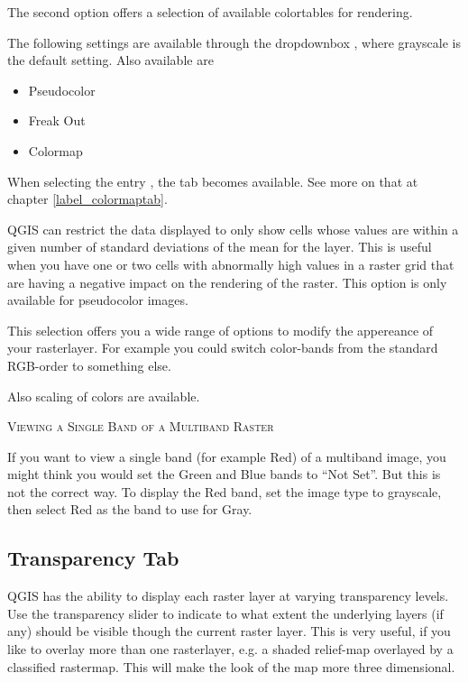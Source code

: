 The second option offers a selection of available colortables for rendering.

The following settings are available through the dropdownbox
, where grayscale is the default
setting.
Also available are
\begin{itemize}[label=--]
\item Pseudocolor
\item Freak Out
\item Colormap
\end{itemize}

When selecting the entry , the tab
 becomes available. See more on that at chapter
\ref{label_colormaptab}.

QGIS can restrict the data displayed to only show cells whose values are
within a given number of standard deviations of the mean for the
layer. This is useful when you have one or
two cells with abnormally high values in a raster grid that are having a
negative impact on the rendering of the raster. This option is only available
for pseudocolor images.


This selection offers you a wide range of options to modify the appereance
of your rasterlayer. For example you could switch color-bands from the
standard RGB-order to something else.

Also scaling of colors are available.


\begin{Tip}\caption{\textsc{Viewing a Single Band of a Multiband Raster}}
If you want to view a single band (for example Red) of a multiband
image, you might think you would set the Green and Blue bands to ``Not
Set''. But this is not the correct way. To display the Red band, 
set the image type to grayscale, then select Red as the band to use for Gray.
\end{Tip} 

\subsection{Transparency Tab} \label{rastertab:transparency}

QGIS has the ability to display each raster layer at varying transparency
levels. Use the transparency slider to indicate to
what extent the underlying layers (if any) should be visible though the
current raster layer. 
This is very useful, if
you like to overlay more than one rasterlayer, e.g. a shaded relief-map
overlayed by a classified rastermap. This will make the look of the map
more three dimensional.

